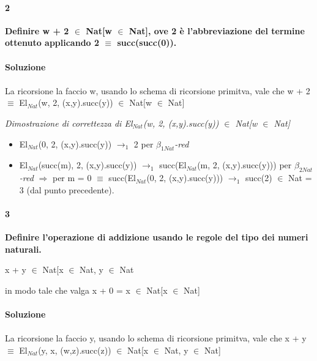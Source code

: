 \paragraph{2}
\textbf{Definire w + 2 $\in$ Nat[w $\in$ Nat], ove 2 \`e l'abbreviazione del termine ottenuto applicando 2 $\equiv$ succ(succ(0)).}
\\\\
\textbf{Soluzione}\\\\
La ricorsione la faccio w, usando lo schema di ricorsione primitva, vale che w + 2 $\equiv$ El$_{Nat}$(w, 2, (x,y).succ(y)) $\in$ Nat[w $\in$ Nat]

\small
\begin{prooftree}
\end{prooftree}
\noindent
\normalsize \textit{Dimostrazione di correttezza di El$_{Nat}$(w, 2, (x,y).succ(y)) $\in$ Nat[w $\in$ Nat]}
\begin{itemize}
\item El$_{Nat}$(0, 2, (x,y).succ(y)) $\rightarrow_1$ 2 per \textit{$\beta_{1Nat}$-red}
\item El$_{Nat}$(succ(m), 2, (x,y).succ(y)) $\rightarrow_1$ succ(El$_{Nat}$(m, 2, (x,y).succ(y))) per \textit{$\beta_{2Nat}$-red} $\Rightarrow$ per m = 0 $\equiv$ succ(El$_{Nat}$(0, 2, (x,y).succ(y))) $\rightarrow_1$ succ(2) $\in$ Nat = 3 (dal punto precedente).
\end{itemize}

\paragraph{3}
\textbf{Definire l'operazione di addizione usando le regole del tipo dei numeri naturali.}
\begin{center} x + y $\in$ Nat[x $\in$ Nat, y $\in$ Nat\end{center}
in modo tale che valga x + 0 = x $\in$  Nat[x $\in$ Nat]
\\\\
\textbf{Soluzione}\\\\
La ricorsione la faccio y, usando lo schema di ricorsione primitva, vale che x + y $\equiv$ El$_{Nat}$(y, x, (w,z).succ(z)) $\in$ Nat[x $\in$ Nat, y $\in$ Nat]


